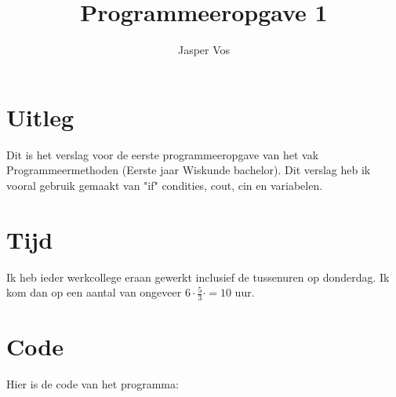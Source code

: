 \documentclass[10pt]{article}
\title{Programmeeropgave 1}
\author{Jasper Vos}
\begin{document}

\maketitle

\section{Uitleg}
Dit is het verslag voor de eerste programmeeropgave van het vak Programmeermethoden (Eerste jaar Wiskunde bachelor).
Dit verslag heb ik vooral gebruik gemaakt van "if" condities, cout, cin en variabelen.

\section{Tijd}
Ik heb ieder werkcollege eraan gewerkt inclusief de tussenuren op donderdag.
Ik kom dan op een aantal van ongeveer $6\cdot\frac{5}{3} \cdot  = 10$ uur.

\section*{Code}
Hier is de code van het programma:


\end{document}
